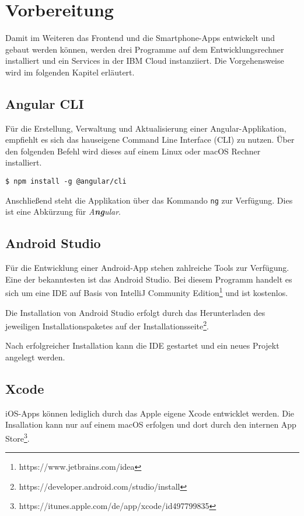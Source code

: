\section{Vorbereitung}
Damit im Weiteren das Frontend und die Smartphone-Apps entwickelt und gebaut werden können, werden drei Programme auf
dem Entwicklungsrechner installiert und ein Services in der IBM Cloud instanziiert. Die Vorgehensweise wird im
folgenden Kapitel erläutert.

\subsection{Angular CLI}
Für die Erstellung, Verwaltung und Aktualisierung einer Angular-Applikation, empfiehlt es sich das hauseigene Command
Line Interface (CLI) zu nutzen. Über den folgenden Befehl wird dieses auf einem Linux oder macOS Rechner installiert.

\begin{lstlisting}[caption=Installation des Angular CLI, label=ls:vorbereitung_angularcli]
    $ npm install -g @angular/cli
\end{lstlisting}

Anschließend steht die Applikation über das Kommando \texttt{ng} zur Verfügung. Dies ist eine Abkürzung für
\textit{A\textbf{ng}ular}.

\subsection{Android Studio}
Für die Entwicklung einer Android-App stehen zahlreiche Tools zur Verfügung. Eine der bekanntesten ist das Android
Studio. Bei diesem Programm handelt es sich um eine IDE auf Basis von IntelliJ Community
Edition\footnote{https://www.jetbrains.com/idea} und ist kostenlos.

Die Installation von Android Studio erfolgt durch das Herunterladen des jeweiligen Installationspaketes auf der
Installationsseite\footnote{https://developer.android.com/studio/install}.

Nach erfolgreicher Installation kann die IDE gestartet und ein neues Projekt angelegt werden.

\subsection{Xcode}
iOS-Apps können lediglich durch das Apple eigene Xcode entwicklet werden. Die Insallation kann nur auf einem macOS
erfolgen und dort durch den internen App Store\footnote{https://itunes.apple.com/de/app/xcode/id497799835}.


